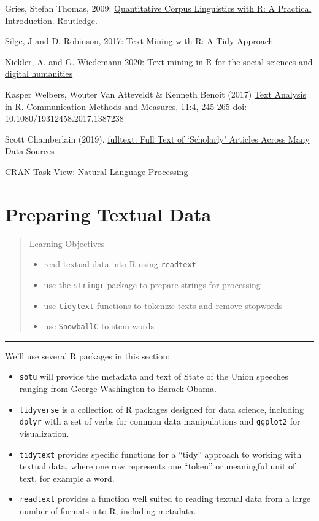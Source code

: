 \documentclass[
]{book}
\providecommand{\tightlist}{%
  \setlength{\itemsep}{0pt}\setlength{\parskip}{0pt}}
\begin{document}
Gries, Stefan Thomas, 2009: \href{http://www.stgries.info/research/qclwr/qclwr.html}{Quantitative Corpus Linguistics with R: A Practical Introduction}. Routledge.

Silge, J and D. Robinson, 2017: \href{http://tidytextmining.com/}{Text Mining with R: A Tidy Approach}

Niekler, A. and G. Wiedemann 2020: \href{https://tm4ss.github.io/docs/index.html}{Text mining in R for the social sciences and digital humanities}

Kasper Welbers, Wouter Van Atteveldt \& Kenneth Benoit (2017) \href{https://doi.org/10.1080/19312458.2017.1387238}{Text Analysis in R}. Communication Methods and Measures, 11:4, 245-265 doi: 10.1080/19312458.2017.1387238

Scott Chamberlain (2019). \href{https://books.ropensci.org/fulltext/}{fulltext: Full Text of `Scholarly' Articles Across Many Data Sources}

\href{https://CRAN.R-project.org/view=NaturalLanguageProcessing}{CRAN Task View: Natural Language Processing}

\chapter{Preparing Textual Data}\label{textprep}

\begin{quote}
Learning Objectives

\begin{itemize}
\tightlist
\item
  read textual data into R using \texttt{readtext}
\item
  use the \texttt{stringr} package to prepare strings for processing
\item
  use \texttt{tidytext} functions to tokenize texts and remove stopwords
\item
  use \texttt{SnowballC} to stem words
\end{itemize}
\end{quote}

\begin{center}\rule{0.5\linewidth}{0.5pt}\end{center}

We'll use several R packages in this section:

\begin{itemize}
\tightlist
\item
  \texttt{sotu} will provide the metadata and text of State of the Union speeches ranging from George Washington to Barack Obama.
\item
  \texttt{tidyverse} is a collection of R packages designed for data science, including \texttt{dplyr} with a set of verbs for common data manipulations and \texttt{ggplot2} for visualization.
\item
  \texttt{tidytext} provides specific functions for a ``tidy'' approach to working with textual data, where one row represents one ``token'' or meaningful unit of text, for example a word.
\item
  \texttt{readtext} provides a function well suited to reading textual data from a large number of formats into R, including metadata.
\end{itemize}
\end{document}
